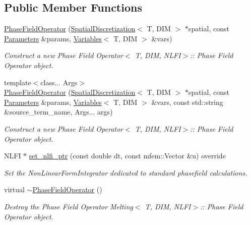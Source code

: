 \subsection*{Public Member Functions}
\begin{DoxyCompactItemize}
\item 
\hyperlink{classPhaseFieldOperator_ad71bd4990d4d0098766e37a135655c1f}{Phase\+Field\+Operator} (\hyperlink{classSpatialDiscretization}{Spatial\+Discretization}$<$ T, D\+IM $>$ $\ast$spatial, const \hyperlink{classParameters}{Parameters} \&params, \hyperlink{classVariables}{Variables}$<$ T, D\+IM $>$ \&vars)
\begin{DoxyCompactList}\small\item\em Construct a new Phase Field Operator$<$ T,  D\+I\+M,  N\+L\+F\+I$>$\+:\+: Phase Field Operator object. \end{DoxyCompactList}\item 
{\footnotesize template$<$class... Args$>$ }\\\hyperlink{classPhaseFieldOperator_ad190a0a04db9daaa6f220a88a5522480}{Phase\+Field\+Operator} (\hyperlink{classSpatialDiscretization}{Spatial\+Discretization}$<$ T, D\+IM $>$ $\ast$spatial, const \hyperlink{classParameters}{Parameters} \&params, \hyperlink{classVariables}{Variables}$<$ T, D\+IM $>$ \&vars, const std\+::string \&source\+\_\+term\+\_\+name, Args... args)
\begin{DoxyCompactList}\small\item\em Construct a new Phase Field Operator$<$ T,  D\+I\+M,  N\+L\+F\+I$>$\+:\+: Phase Field Operator object. \end{DoxyCompactList}\item 
N\+L\+FI $\ast$ \hyperlink{classPhaseFieldOperator_a794471a8c45b86717f73e63e17d40ff0}{set\+\_\+nlfi\+\_\+ptr} (const double dt, const mfem\+::\+Vector \&u) override
\begin{DoxyCompactList}\small\item\em Set the Non\+Linear\+Form\+Integrator dedicated to standard phasefield calculations. \end{DoxyCompactList}\item 
virtual \hyperlink{classPhaseFieldOperator_ae22837e1962c281894631439b7029f73}{$\sim$\+Phase\+Field\+Operator} ()
\begin{DoxyCompactList}\small\item\em Destroy the Phase Field Operator Melting$<$ T,  D\+I\+M,  N\+L\+F\+I$>$\+:\+: Phase Field Operator object. \end{DoxyCompactList}\item 

\end{DoxyCompactItemize}
